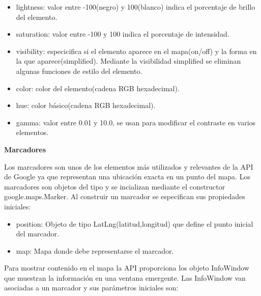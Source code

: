 \begin{itemize}

\item lightness: valor entre -100(negro) y 100(blanco) indica el porcentaje de brillo del elemento.

\item saturation: valor entre -100 y 100 indica el porcentaje de intensidad.

\item visibility: especicifica si el elemento aparece en el mapa(on/off) y la forma en la que aparece(simplified). Mediante la visibilidad simplified se eliminan algunas funciones de estilo del elemento.

\item color: color del elemento(cadena RGB hexadecimal).

\item hue: color básico(cadena RGB hexadecimal).

\item gamma: valor entre 0.01 y 10.0, se usan para modificar el contraste en varios elementos.

\end{itemize}

\vspace{5 mm}

\textbf{Marcadores}

Los marcadores son unos de los elementos más utilizados y relevantes de la API de Google ya que representan una ubicación exacta en un punto del mapa. Los marcadores son objetos del tipo  y se incializan mediante el constructor google.maps.Marker. Al construir un marcador se especifican sus propiedades iniciales:

\begin{itemize}

\item position: Objeto de tipo LatLng(latitud,longitud) que define el punto inicial del marcador.

\item map: Mapa donde debe representarse el marcador.

\end{itemize}

Para mostrar contenido en el mapa la API proporciona los objeto InfoWindow que muestran la información en una ventana emergente. Las InfoWindow van asociadas a un marcador y sus parámetros iniciales son:

